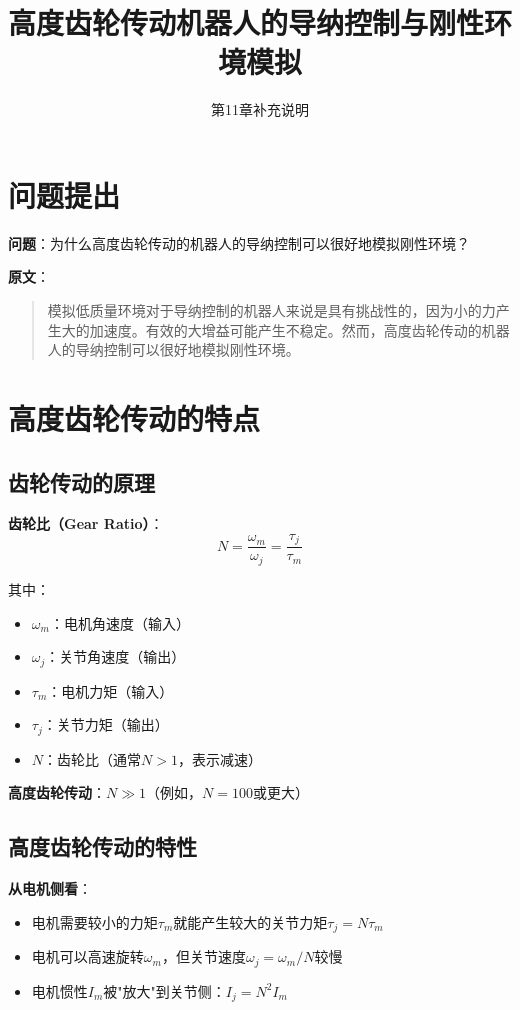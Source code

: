 \documentclass[12pt,a4paper]{article}
\title{高度齿轮传动机器人的导纳控制与刚性环境模拟}
\author{第11章补充说明}
\date{}
\begin{document}
\maketitle

\section{问题提出}

\textbf{问题}：为什么高度齿轮传动的机器人的导纳控制可以很好地模拟刚性环境？

\textbf{原文}：
\begin{quote}
模拟低质量环境对于导纳控制的机器人来说是具有挑战性的，因为小的力产生大的加速度。有效的大增益可能产生不稳定。然而，高度齿轮传动的机器人的导纳控制可以很好地模拟刚性环境。
\end{quote}

\section{高度齿轮传动的特点}

\subsection{齿轮传动的原理}

\textbf{齿轮比（Gear Ratio）}：
\begin{equation}
N = \frac{\omega_m}{\omega_j} = \frac{\tau_j}{\tau_m}
\end{equation}

其中：
\begin{itemize}
\item $\omega_m$：电机角速度（输入）
\item $\omega_j$：关节角速度（输出）
\item $\tau_m$：电机力矩（输入）
\item $\tau_j$：关节力矩（输出）
\item $N$：齿轮比（通常$N > 1$，表示减速）
\end{itemize}

\textbf{高度齿轮传动}：$N \gg 1$（例如，$N = 100$或更大）

\subsection{高度齿轮传动的特性}

\textbf{从电机侧看}：
\begin{itemize}
\item 电机需要较小的力矩$\tau_m$就能产生较大的关节力矩$\tau_j = N\tau_m$
\item 电机可以高速旋转$\omega_m$，但关节速度$\omega_j = \omega_m/N$较慢
\item 电机惯性$I_m$被"放大"到关节侧：$I_j = N^2 I_m$
\end{itemize}
\end{document}
